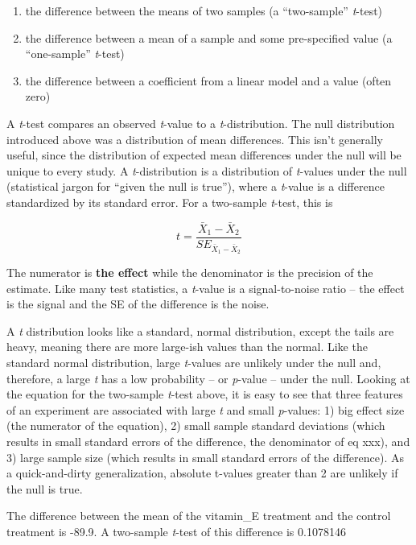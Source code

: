 \documentclass[]{book}
\providecommand{\tightlist}{%
  \setlength{\itemsep}{0pt}\setlength{\parskip}{0pt}}
\begin{document}
\begin{enumerate}
\def\labelenumi{\arabic{enumi}.}
\tightlist
\item
  the difference between the means of two samples (a ``two-sample'' \emph{t}-test)
\item
  the difference between a mean of a sample and some pre-specified value (a ``one-sample'' \emph{t}-test)
\item
  the difference between a coefficient from a linear model and a value (often zero)
\end{enumerate}

A \emph{t}-test compares an observed \emph{t}-value to a \emph{t}-distribution. The null distribution introduced above was a distribution of mean differences. This isn't generally useful, since the distribution of expected mean differences under the null will be unique to every study. A \emph{t}-distribution is a distribution of \emph{t}-values under the null (statistical jargon for ``given the null is true''), where a \emph{t}-value is a difference standardized by its standard error. For a two-sample \emph{t}-test, this is

\begin{equation}
t = \frac{\bar{X}_1 - \bar{X}_2}{SE_{\bar{X}_1 - \bar{X}_2}}
\end{equation}

The numerator is \textbf{the effect} while the denominator is the precision of the estimate. Like many test statistics, a \emph{t}-value is a signal-to-noise ratio -- the effect is the signal and the SE of the difference is the noise.

A \emph{t} distribution looks like a standard, normal distribution, except the tails are heavy, meaning there are more large-ish values than the normal. Like the standard normal distribution, large \emph{t}-values are unlikely under the null and, therefore, a large \emph{t} has a low probability -- or \emph{p}-value -- under the null. Looking at the equation for the two-sample \emph{t}-test above, it is easy to see that three features of an experiment are associated with large \emph{t} and small \emph{p}-values: 1) big effect size (the numerator of the equation), 2) small sample standard deviations (which results in small standard errors of the difference, the denominator of eq xxx), and 3) large sample size (which results in small standard errors of the difference). As a quick-and-dirty generalization, absolute t-values greater than 2 are unlikely if the null is true.

The difference between the mean of the vitamin\_E treatment and the control treatment is -89.9. A two-sample \emph{t}-test of this difference is 0.1078146
\end{document}
